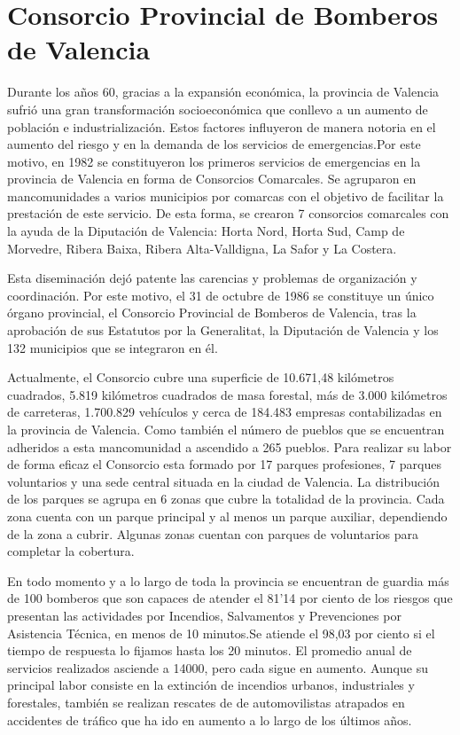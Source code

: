 \documentclass[12pt,a4paper,titlepage,twoside]{report}
\begin{document}
\section{Consorcio Provincial de Bomberos de Valencia}
Durante los años 60, gracias a la expansión económica, la provincia de Valencia sufrió una gran transformación socioeconómica que conllevo a un aumento de población e industrialización. Estos factores influyeron de manera notoria en el aumento del riesgo y en la demanda de los servicios de emergencias.Por este motivo, en 1982 se constituyeron los primeros servicios de emergencias en la provincia de Valencia en forma de Consorcios Comarcales. Se agruparon en mancomunidades a varios municipios por comarcas con el objetivo de facilitar la prestación de este servicio. De esta forma, se crearon 7 consorcios comarcales con la ayuda de la Diputación de Valencia: Horta Nord, Horta Sud, Camp de Morvedre, Ribera Baixa, Ribera Alta-Valldigna, La Safor y La Costera.
\par
Esta diseminación dejó patente las carencias y problemas de organización y coordinación. Por este motivo, el 31 de octubre de 1986 se constituye un único órgano provincial, el Consorcio Provincial de Bomberos de Valencia, tras la aprobación de sus Estatutos por la Generalitat, la Diputación de Valencia y los 132 municipios que se integraron en él.
\par
Actualmente, el Consorcio cubre una superficie de 10.671,48 kilómetros cuadrados, 5.819 kilómetros cuadrados de masa forestal, más de 3.000 kilómetros de carreteras, 1.700.829 vehículos y cerca de 184.483 empresas contabilizadas en la provincia de Valencia. Como también el número de pueblos que se encuentran adheridos a esta mancomunidad a ascendido a 265 pueblos. Para realizar su labor de forma eficaz el Consorcio esta formado por 17 parques profesiones, 7 parques voluntarios y una sede central situada en la ciudad de Valencia. La distribución de los parques se agrupa en 6 zonas que cubre la totalidad de la provincia. Cada zona cuenta con un parque principal y al menos un parque auxiliar, dependiendo de la zona a cubrir. Algunas zonas cuentan con parques de voluntarios para completar la cobertura.
\par
En todo momento y a lo largo de toda la provincia se encuentran de guardia más de 100 bomberos que son capaces de atender el 81'14 por ciento de los riesgos que presentan las actividades por Incendios, Salvamentos y Prevenciones por Asistencia Técnica, en menos de 10 minutos.Se atiende el 98,03 por ciento si el tiempo de respuesta lo fijamos hasta los 20 minutos.
El promedio anual de servicios realizados asciende a 14000, pero cada sigue en aumento. Aunque su principal labor consiste en la extinción de incendios urbanos, industriales y forestales, también se realizan rescates de de automovilistas atrapados en accidentes de tráfico que ha ido en aumento a lo largo de los últimos años. 
\end{document}
